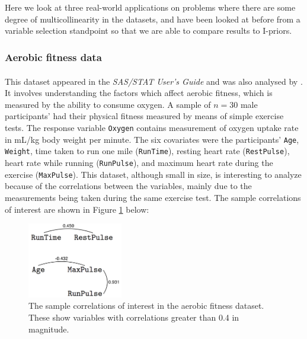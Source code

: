 Here we look at three real-world applications on problems where there are some degree of multicollinearity in the datasets, and have been looked at before from a variable selection standpoint so that we are able to compare results to I-priors.

\subsubsection{Aerobic fitness data}

This dataset appeared in the \textit{SAS/STAT\textsuperscript{\textregistered} User's Guide} \cite{SAS2008} and was also analysed by \cite{Kuo1998}. It involves understanding the factors which affect aerobic fitness, which is measured by the ability to consume oxygen. A sample of $n=30$ male participants' had their physical fitness measured by means of simple exercise tests. The response variable \texttt{Oxygen} contains measurement of oxygen uptake rate in mL/kg body weight per minute. The six covariates were the participants' \texttt{Age}, \texttt{Weight}, time taken to run one mile (\texttt{RunTime}), resting heart rate (\texttt{RestPulse}), heart rate while running (\texttt{RunPulse}), and maximum heart rate during the exercise (\texttt{MaxPulse}). This dataset, although small in size, is interesting to analyze because of the correlations between the variables, mainly due to the measurements being taken during the same exercise test. The sample correlations of interest are shown in Figure \ref{fig:aerobic-cor} below:

\begin{figure}[H]
	\centering
	\includegraphics[height=1.3in]{figure/aerobic-cor}
	\caption{The sample correlations of interest in the aerobic fitness dataset. These show variables with correlations greater than 0.4 in magnitude. \label{fig:aerobic-cor}}
\end{figure}

